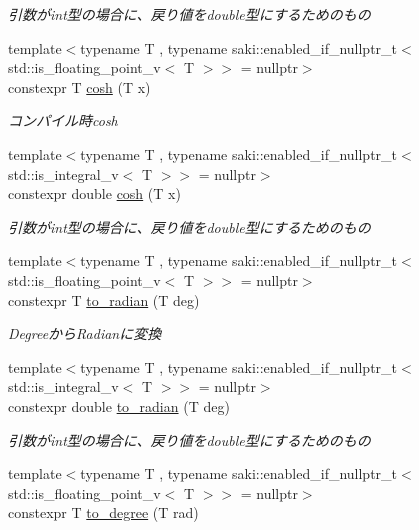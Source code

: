 \begin{DoxyCompactItemize}
\begin{DoxyCompactList}\small\item\em 引数がint型の場合に、戻り値をdouble型にするためのもの \end{DoxyCompactList}\item 
{\footnotesize template$<$typename T , typename saki\+::enabled\+\_\+if\+\_\+nullptr\+\_\+t$<$ std\+::is\+\_\+floating\+\_\+point\+\_\+v$<$ T $>$$>$  = nullptr$>$ }\\constexpr T \mbox{\hyperlink{namespacesaki_a0f8167af6da5c9eb510d33dadae13708}{cosh}} (T x)
\begin{DoxyCompactList}\small\item\em コンパイル時cosh \end{DoxyCompactList}\item 
{\footnotesize template$<$typename T , typename saki\+::enabled\+\_\+if\+\_\+nullptr\+\_\+t$<$ std\+::is\+\_\+integral\+\_\+v$<$ T $>$$>$  = nullptr$>$ }\\constexpr double \mbox{\hyperlink{namespacesaki_afe248729248030bd5858469409e902d2}{cosh}} (T x)
\begin{DoxyCompactList}\small\item\em 引数がint型の場合に、戻り値をdouble型にするためのもの \end{DoxyCompactList}\item 
{\footnotesize template$<$typename T , typename saki\+::enabled\+\_\+if\+\_\+nullptr\+\_\+t$<$ std\+::is\+\_\+floating\+\_\+point\+\_\+v$<$ T $>$$>$  = nullptr$>$ }\\constexpr T \mbox{\hyperlink{namespacesaki_a27595b1e53058ce792db7f8d29e2e9af}{to\+\_\+radian}} (T deg)
\begin{DoxyCompactList}\small\item\em Degreeから\+Radianに変換 \end{DoxyCompactList}\item 
{\footnotesize template$<$typename T , typename saki\+::enabled\+\_\+if\+\_\+nullptr\+\_\+t$<$ std\+::is\+\_\+integral\+\_\+v$<$ T $>$$>$  = nullptr$>$ }\\constexpr double \mbox{\hyperlink{namespacesaki_aa671d122197cf10439eee0d271f51fe6}{to\+\_\+radian}} (T deg)
\begin{DoxyCompactList}\small\item\em 引数がint型の場合に、戻り値をdouble型にするためのもの \end{DoxyCompactList}\item 
{\footnotesize template$<$typename T , typename saki\+::enabled\+\_\+if\+\_\+nullptr\+\_\+t$<$ std\+::is\+\_\+floating\+\_\+point\+\_\+v$<$ T $>$$>$  = nullptr$>$ }\\constexpr T \mbox{\hyperlink{namespacesaki_af9f6d8f2c0663a0452c7edd17bf5daf0}{to\+\_\+degree}} (T rad)

\end{DoxyCompactItemize}
